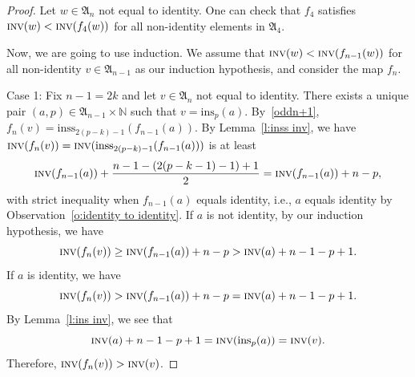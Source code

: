 \documentclass[12pt]{amsart}
\theoremstyle{definition}
\numberwithin{equation}{section}
\newcommand{\inv}{\textsc{inv}}
\newcommand{\ins}[1]{\mathrm{ins}_{#1}}
\newcommand{\inss}[1]{\mathrm{inss}_{#1}}
\begin{document}
\begin{proof}

    Let $w \in \mathfrak A_n$ not equal to identity. One can check that $f_4$ satisfies $\inv (w) < \inv (f_4(w))$ for all non-identity elements in $\mathfrak A_4$.

    Now, we are going to use induction. We assume that $\inv (w) < \inv (f_{n-1}(w))$ for all non-identity $v \in \mathfrak A_{n-1}$ as our induction hypothesis, and consider the map $f_{n}$.

    Case 1: Fix $n-1 = 2k$ and let $v \in \mathfrak A_n$ not equal to identity. There exists a unique pair $(a,p) \in \mathfrak A_{n-1} \times \mathbb N$ such that $v = \ins{p} (a)$. By~\eqref{oddn+1}, $f_n(v)=\inss{2(p-k)-1}(f_{n-1}(a))$. By Lemma~\ref{l:inss inv}, we have $\inv (f_n(v)) = \inv (\inss{2(p-k)-1} (f_{n-1}(a)))$ is at least
    \begin{equation*}
         \inv (f_{n-1}(a)) + \frac{n-1 -(2(p-k-1)-1)+1}{2} = \inv (f_{n-1}(a)) + n-p,
    \end{equation*} with strict inequality when $f_{n-1}(a)$ equals identity, i.e., $a$ equals identity by Observation~\ref{o:identity to identity}.
    If $a$ is not identity, by our induction hypothesis, we have \begin{equation*}
        \inv (f_n(v)) \geq \inv(f_{n-1}(a)) +n -p > \inv (a) +n-1-p+1.
    \end{equation*} If $a$ is identity, we have \begin{equation*}
        \inv (f_n(v)) > \inv(f_{n-1}(a)) +n -p = \inv (a) +n-1-p+1.
        \end{equation*}
    By Lemma~\ref{l:ins inv}, we see that \begin{equation*}
        \inv (a) +n-1-p+1 = \inv(\ins{p}(a)) = \inv (v).
    \end{equation*}Therefore, $\inv (f_n(v)) > \inv (v)$.


\end{proof}
\end{document}
